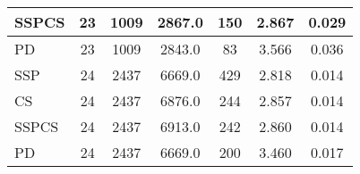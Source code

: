 \documentclass{article}
\begin{document}
\begin{table}[H]
{\begin{tabular}{|l|c|c|c|c|c|c|}
SSPCS              & 23             & 1009              & 2867.0                 & 150            & 2.867                     & 0.029                                   \\ \hline
PD                 & 23             & 1009              & 2843.0                 & 83             & 3.566                     & 0.036                                   \\ \hline
\hhline{|=======|}
SSP                & 24             & 2437              & 6669.0                 & 429            & 2.818                     & 0.014                                   \\ \hline
CS                 & 24             & 2437              & 6876.0                 & 244            & 2.857                     & 0.014                                   \\ \hline
SSPCS              & 24             & 2437              & 6913.0                 & 242            & 2.860                     & 0.014                                   \\ \hline
PD                 & 24             & 2437              & 6669.0                 & 200            & 3.460                     & 0.017                                   \\ \hline
\end{tabular}%
}
\label{tab:simulation2_set4_algorithm_metrics}
\end{table}


\begin{table}[H]
\centering
\caption{Simulation 2, Set 5: Graph Characteristics}
\label{tab:simulation2_set5_graph_characteristics}
\end{table}
\end{document}
